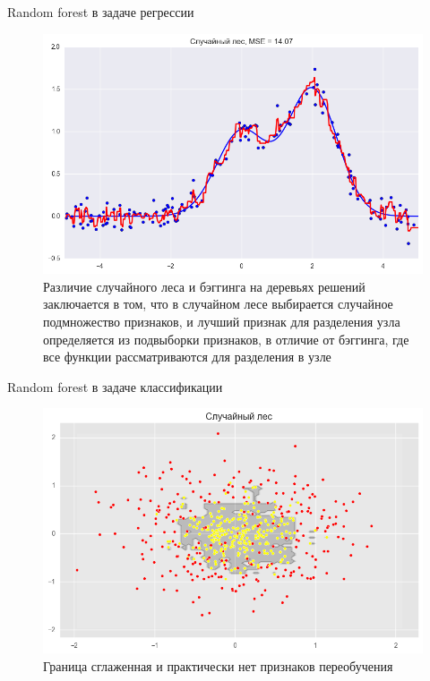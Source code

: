\documentclass[notheorems, handout]{beamer}
\begin{document}
\begin{frame}{Random forest в задаче регрессии}
  \begin{figure}[h!]
    \includegraphics[width=0.8 \textwidth]{img/rf_re}
    \caption{Различие случайного леса и бэггинга на деревьях решений
      заключается в том, что в случайном лесе выбирается случайное
      подмножество признаков, и лучший признак для разделения узла
      определяется из подвыборки признаков, в отличие от бэггинга, где
    все функции рассматриваются для разделения в узле}
  \end{figure}
\end{frame}

\begin{frame}{Random forest в задаче классификации}
  \begin{figure}[h!]
    \includegraphics[width=1 \textwidth]{img/rf_cl}
    \caption{Граница сглаженная и практически нет признаков переобучения}
  \end{figure}
\end{frame}
\end{document}

